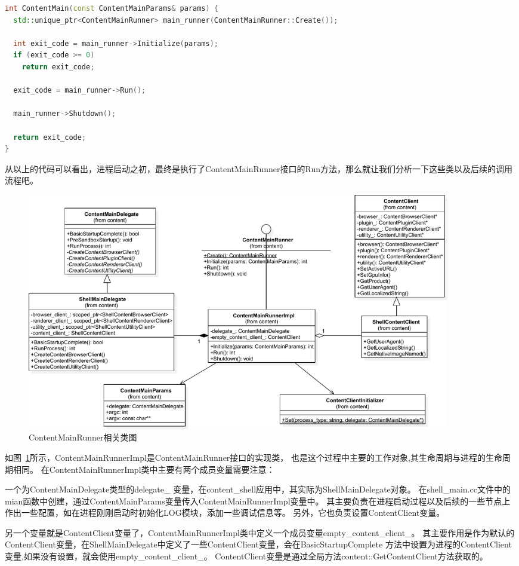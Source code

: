 \begin{spacing}{1.0}
\begin{lstlisting}[language={C++}]
int ContentMain(const ContentMainParams& params) {
  std::unique_ptr<ContentMainRunner> main_runner(ContentMainRunner::Create());

  int exit_code = main_runner->Initialize(params);
  if (exit_code >= 0)
    return exit_code;

  exit_code = main_runner->Run();

  main_runner->Shutdown();

  return exit_code;
}
\end{lstlisting}
\end{spacing}

从以上的代码可以看出，进程启动之初，最终是执行了ContentMainRunner接口的Run方法，那么就让我们分析一下这些类以及后续的调用流程吧。

\begin{figure}[H] 
  \centering 
  \includegraphics[width=0.90\textwidth]{image/process_study/ContentMainRunner.pdf} 
  \caption{ContentMainRunner相关类图} \label{fig:ContentMainRunnerClass} 
\end{figure}

如图~\ref{fig:ContentMainRunnerClass}所示，ContentMainRunnerImpl是ContentMainRunner接口的实现类，
也是这个过程中主要的工作对象,其生命周期与进程的生命周期相同。
在ContentMainRunnerImpl类中主要有两个成员变量需要注意：

一个为ContentMainDelegate类型的delegate\_
变量，在content\_shell应用中，其实际为ShellMainDelegate对象。
在shell\_main.cc文件中的mian函数中创建，通过ContentMainParams变量传入ContentMainRunnerImpl变量中。
其主要负责在进程启动过程以及后续的一些节点上作出一些配置，如在进程刚刚启动时初始化LOG模块，添加一些调试信息等。
另外，它也负责设置ContentClient变量。

另一个变量就是ContentClient变量了，ContentMainRunnerImpl类中定义一个成员变量empty\_content\_client\_。
其主要作用是作为默认的ContentClient变量，在ShellMainDelegate中定义了一些ContentClient变量，会在BasicStartupComplete
方法中设置为进程的ContentClient变量,如果没有设置，就会使用empty\_content\_client\_。
ContentClient变量是通过全局方法content::GetContentClient方法获取的。


